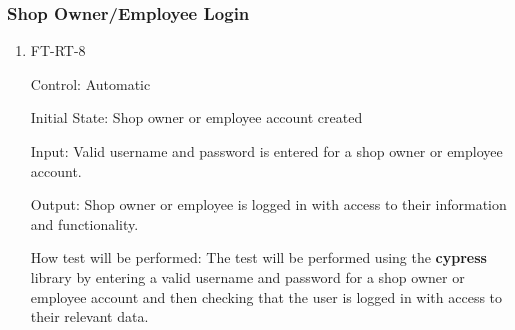 \documentclass[12pt, titlepage]{article}
\begin{document}
\subsubsection{Shop Owner/Employee Login}

\begin{enumerate}

\item{FT-RT-8\\}

Control: Automatic
					
Initial State: Shop owner or employee account created
					
Input: Valid username and password is entered for a shop owner or employee account.
					
Output: Shop owner or employee is logged in with access to their information and functionality.

How test will be performed: The test will be performed using the \textbf{cypress} library by entering a valid username and password for a shop owner or employee account and then checking that the user is logged in with access to their relevant data.

\end{enumerate}
\end{document}
